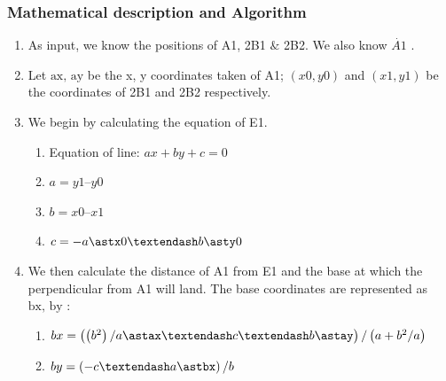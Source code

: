 \documentclass[12pt]{report}
\begin{document}

\subsubsection*{Mathematical description and Algorithm }
\begin{enumerate}
	\item As input, we know the positions of A1, 2B1 $\&$  2B2. We also know  \( \dot{A1} \) . \par

	\item Let  \( \text{ax, ay} \)  be the x, y coordinates taken of A1;  \(  \left( x0, y0 \right)  \)  and  \(  \left( x1, y1 \right)  \)  be the coordinates of 2B1 and 2B2 respectively.\par

	\item We begin by calculating the equation of E1.\par

\begin{enumerate}
	\item Equation of line:  \( ax + by + c = 0 \) \par

	\item  \( a = y1 – y0 \) \par

	\item  \( b = x0 – x1 \) \par

	\item  \( c = -a\astx0 – b\asty0 \) \par


\end{enumerate}
	\item We then calculate the distance of A1 from E1 and the base at which the perpendicular from A1 will land. The base coordinates are represented as  \( \text{bx, by} \) :\par

\begin{enumerate}
	\item  \( bx =  \left(  \left( b^{2} \right) /a\astax – c – b\astay \right) / \left( a + b^{2}/a \right)  \) \par

	\item  \( by= \left( -c–a\astbx \right) /b \) \par


\end{enumerate}
\end{enumerate}
\end{document}
